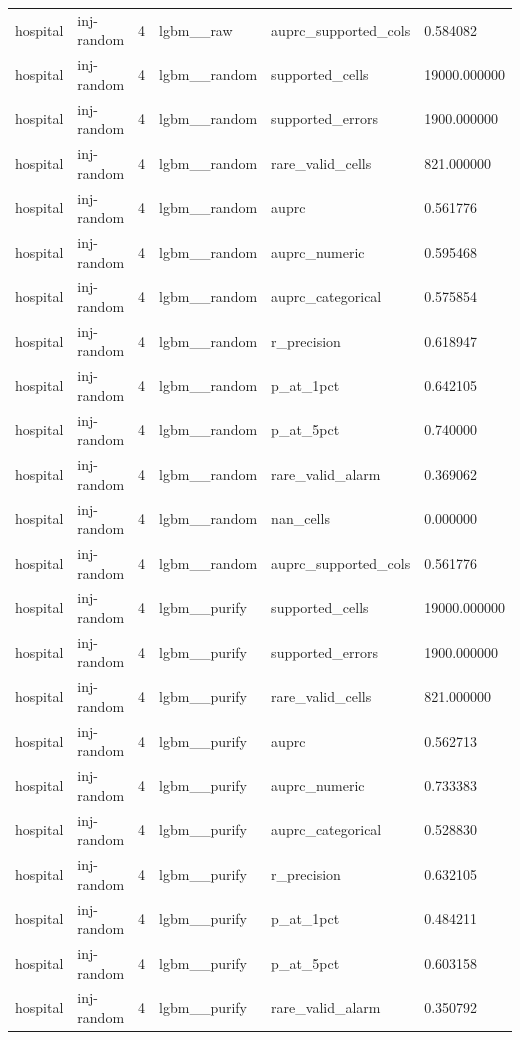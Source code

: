 \begin{tabular}{llllll}
hospital & inj-random & 4 & lgbm\_\_raw & auprc\_supported\_cols & 0.584082 \\
hospital & inj-random & 4 & lgbm\_\_random & supported\_cells & 19000.000000 \\
hospital & inj-random & 4 & lgbm\_\_random & supported\_errors & 1900.000000 \\
hospital & inj-random & 4 & lgbm\_\_random & rare\_valid\_cells & 821.000000 \\
hospital & inj-random & 4 & lgbm\_\_random & auprc & 0.561776 \\
hospital & inj-random & 4 & lgbm\_\_random & auprc\_numeric & 0.595468 \\
hospital & inj-random & 4 & lgbm\_\_random & auprc\_categorical & 0.575854 \\
hospital & inj-random & 4 & lgbm\_\_random & r\_precision & 0.618947 \\
hospital & inj-random & 4 & lgbm\_\_random & p\_at\_1pct & 0.642105 \\
hospital & inj-random & 4 & lgbm\_\_random & p\_at\_5pct & 0.740000 \\
hospital & inj-random & 4 & lgbm\_\_random & rare\_valid\_alarm & 0.369062 \\
hospital & inj-random & 4 & lgbm\_\_random & nan\_cells & 0.000000 \\
hospital & inj-random & 4 & lgbm\_\_random & auprc\_supported\_cols & 0.561776 \\
hospital & inj-random & 4 & lgbm\_\_purify & supported\_cells & 19000.000000 \\
hospital & inj-random & 4 & lgbm\_\_purify & supported\_errors & 1900.000000 \\
hospital & inj-random & 4 & lgbm\_\_purify & rare\_valid\_cells & 821.000000 \\
hospital & inj-random & 4 & lgbm\_\_purify & auprc & 0.562713 \\
hospital & inj-random & 4 & lgbm\_\_purify & auprc\_numeric & 0.733383 \\
hospital & inj-random & 4 & lgbm\_\_purify & auprc\_categorical & 0.528830 \\
hospital & inj-random & 4 & lgbm\_\_purify & r\_precision & 0.632105 \\
hospital & inj-random & 4 & lgbm\_\_purify & p\_at\_1pct & 0.484211 \\
hospital & inj-random & 4 & lgbm\_\_purify & p\_at\_5pct & 0.603158 \\
hospital & inj-random & 4 & lgbm\_\_purify & rare\_valid\_alarm & 0.350792 \\

\end{tabular}
